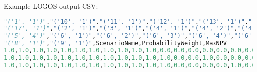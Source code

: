 Example LOGOS output CSV:
\begin{lstlisting}[basicstyle=\tiny,language=python]
"('1', '1')","('10', '1')","('11', '1')","('12', '1')","('13', '1')","('14', '1')","('15', '1')","('16', '1')",
"('17', '1')","('2', '1')","('3', '1')","('4', '1')","('4', '2')","('4', '3')","('5', '1')","('5', '2')","('5', '3')",
"('5', '4')","('6', '1')","('6', '2')","('6', '3')","('6', '4')","('6', '5')","('6', '6')","('6', '7')","('7', '1')",
"('8', '1')","('9', '1')",ScenarioName,ProbabilityWeight,MaxNPV
1.0,1.0,1.0,1.0,1.0,1.0,1.0,1.0,1.0,1.0,1.0,0.0,0.0,0.0,0.0,0.0,0.0,0.0,0.0,0.0,0.0,0.0,0.0,0.0,1.0,1.0,1.0,1.0,scenario_1,0.2,53.865
1.0,1.0,1.0,1.0,1.0,1.0,1.0,1.0,1.0,1.0,1.0,1.0,0.0,0.0,1.0,0.0,0.0,0.0,0.0,0.0,0.0,0.0,0.0,0.0,1.0,1.0,1.0,1.0,scenario_2,0.6,59.488
1.0,1.0,1.0,1.0,1.0,1.0,1.0,1.0,1.0,1.0,1.0,1.0,0.0,0.0,0.0,0.0,1.0,0.0,0.0,0.0,0.0,0.0,0.0,0.0,1.0,1.0,1.0,1.0,scenario_3,0.2,59.826
\end{lstlisting}
